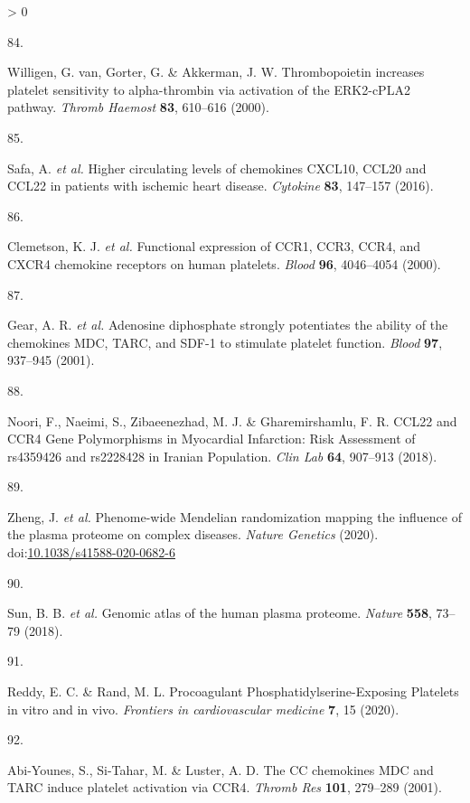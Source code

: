 \documentclass[11pt,twoside]{bristolthesis}
\newlength{\cslhangindent}
\newlength{\csllabelwidth}
\newenvironment{CSLReferences}[2] %
 {%
  \setlength{\parindent}{0pt}
  \ifodd #1 \everypar{\setlength{\hangindent}{\cslhangindent}}\ignorespaces\fi
  \ifnum #2 > 0
  \setlength{\parskip}{#2\baselineskip}
  \fi
 }%
 {}
\newcommand{\CSLLeftMargin}[1]{\parbox[t]{\csllabelwidth}{#1}}
\newcommand{\CSLRightInline}[1]{\parbox[t]{\linewidth - \csllabelwidth}{#1}\break}
\begin{document}
\begin{CSLReferences}{0}{0}
\leavevmode\hypertarget{ref-VanWilligen2000}{}%
\CSLLeftMargin{84. }
\CSLRightInline{Willigen, G. van, Gorter, G. \& Akkerman, J. W. {Thrombopoietin increases platelet sensitivity to alpha-thrombin via activation of the ERK2-cPLA2 pathway}. \emph{Thromb Haemost} \textbf{83}, 610--616 (2000).}

\leavevmode\hypertarget{ref-Safa2016}{}%
\CSLLeftMargin{85. }
\CSLRightInline{Safa, A. \emph{et al.} {Higher circulating levels of chemokines CXCL10, CCL20 and CCL22 in patients with ischemic heart disease}. \emph{Cytokine} \textbf{83}, 147--157 (2016).}

\leavevmode\hypertarget{ref-Clemetson2000}{}%
\CSLLeftMargin{86. }
\CSLRightInline{Clemetson, K. J. \emph{et al.} {Functional expression of CCR1, CCR3, CCR4, and CXCR4 chemokine receptors on human platelets}. \emph{Blood} \textbf{96}, 4046--4054 (2000).}

\leavevmode\hypertarget{ref-Gear2001}{}%
\CSLLeftMargin{87. }
\CSLRightInline{Gear, A. R. \emph{et al.} {Adenosine diphosphate strongly potentiates the ability of the chemokines MDC, TARC, and SDF-1 to stimulate platelet function}. \emph{Blood} \textbf{97}, 937--945 (2001).}

\leavevmode\hypertarget{ref-Noori2018}{}%
\CSLLeftMargin{88. }
\CSLRightInline{Noori, F., Naeimi, S., Zibaeenezhad, M. J. \& Gharemirshamlu, F. R. {CCL22 and CCR4 Gene Polymorphisms in Myocardial Infarction: Risk Assessment of rs4359426 and rs2228428 in Iranian Population}. \emph{Clin Lab} \textbf{64}, 907--913 (2018).}

\leavevmode\hypertarget{ref-Zheng2020}{}%
\CSLLeftMargin{89. }
\CSLRightInline{Zheng, J. \emph{et al.} {Phenome-wide Mendelian randomization mapping the influence of the plasma proteome on complex diseases}. \emph{Nature Genetics} (2020). doi:\href{https://doi.org/10.1038/s41588-020-0682-6}{10.1038/s41588-020-0682-6}}

\leavevmode\hypertarget{ref-Sun2018}{}%
\CSLLeftMargin{90. }
\CSLRightInline{Sun, B. B. \emph{et al.} {Genomic atlas of the human plasma proteome}. \emph{Nature} \textbf{558}, 73--79 (2018).}

\leavevmode\hypertarget{ref-Reddy2020}{}%
\CSLLeftMargin{91. }
\CSLRightInline{Reddy, E. C. \& Rand, M. L. {Procoagulant Phosphatidylserine-Exposing Platelets in vitro and in vivo}. \emph{Frontiers in cardiovascular medicine} \textbf{7}, 15 (2020).}

\leavevmode\hypertarget{ref-Abi-Younes2001}{}%
\CSLLeftMargin{92. }
\CSLRightInline{Abi-Younes, S., Si-Tahar, M. \& Luster, A. D. {The CC chemokines MDC and TARC induce platelet activation via CCR4}. \emph{Thromb Res} \textbf{101}, 279--289 (2001).}


\end{CSLReferences}
\end{document}
